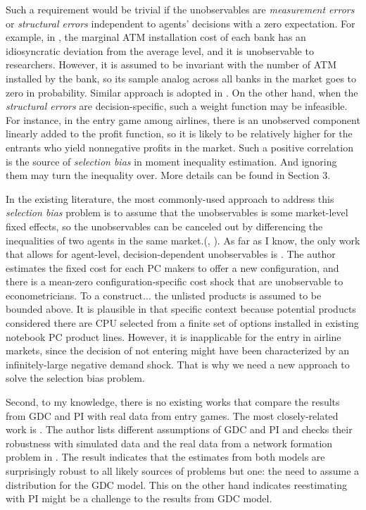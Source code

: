 \documentclass[a4paper]{article}
\begin{document}
Such a requirement would be trivial if the unobservables are \textit{measurement errors} or {\color{red} \textit{structural errors} independent} to agents' decisions with a zero expectation. For example, in \cite{ishii2008compatibility}, the marginal ATM installation cost of each bank has an idiosyncratic deviation from the average level, and it is unobservable to researchers. However, it is assumed to be invariant with the number of ATM installed by the bank, so its sample analog across all banks in the market goes to zero in probability. Similar approach is adopted in \cite{ho2009insurer}. On the other hand, when the \textit{structural errors} are decision-specific, such a weight function may be infeasible. For instance, in the entry game among airlines, there is an unobserved component linearly added to the profit function, so it is likely to be relatively higher for the entrants who yield nonnegative profits in the market. Such a positive correlation is the source of \textit{selection bias} in moment inequality estimation. And ignoring them may turn the inequality over. More details can be found in Section 3.


In the existing literature, the most commonly-used approach to address this \textit{selection bias} problem is to assume that the unobservables is some market-level fixed effects, so the unobservables can be canceled out by differencing the inequalities of two agents in the same market.(\cite{ellickson2013estimating}, \cite{ho2014hospital}). As far as I know, the only work that allows for agent-level, decision-dependent unobservables is \cite{eizenberg2014upstream}. The author estimates the fixed cost for each PC makers to offer a new configuration, and there is a mean-zero configuration-specific cost shock that are unobservable to econometricians. {\color{red}To a construct...} the unlisted products is assumed to be bounded above. It is plausible in that specific context because potential products considered there are CPU selected from a finite set of options installed in existing notebook PC product lines. However, it is inapplicable for the entry in airline markets, since the decision of not entering might have been characterized by an infinitely-large negative demand shock. That is why we need a new approach to solve the selection bias problem.

Second, to my knowledge, there is no existing works that compare the results from GDC and PI with real data from entry games. The most closely-related work is \cite{pakes2010alternative}. The author lists different assumptions of GDC and PI and checks their robustness with simulated data and the real data from a network formation problem in  \cite{ho2009insurer}. The result indicates that the estimates from both models are surprisingly robust to all likely sources of problems but one: the need to assume a distribution for the GDC model. This on the other hand indicates reestimating \cite{ciliberto2009market} with PI might be a challenge to the results from GDC model.
\end{document}

